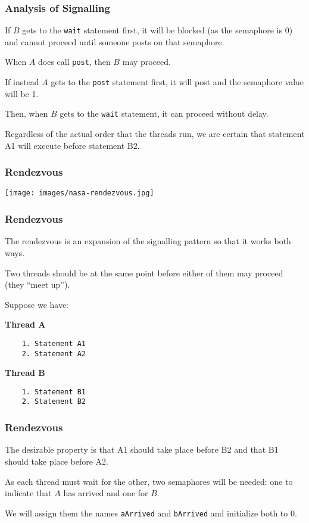 \begin{frame}
	\frametitle{Analysis of Signalling}

	If $B$ gets to the \texttt{wait} statement first, it will be blocked (as the semaphore is 0) and cannot proceed until someone posts on that semaphore.

	When $A$ does call \texttt{post}, then $B$ may proceed.

	If instead $A$ gets to the \texttt{post} statement first, it will post and the semaphore value will be 1.

	Then, when $B$ gets to the \texttt{wait} statement, it can proceed without delay.

	Regardless of the actual order that the threads run, we are certain that statement A1 will execute before statement B2.

\end{frame}


\begin{frame}
	\frametitle{Rendezvous}

	\begin{center}
		\texttt{[image: images/nasa-rendezvous.jpg]}
	\end{center}


\end{frame}


\begin{frame}[fragile]
	\frametitle{Rendezvous}

	The rendezvous is an expansion of the signalling pattern so that it works both ways.

	Two threads should be at the same point before either of them may proceed (they ``meet up'').

	Suppose we have:

	\begin{multicols}{2}
		\textbf{Thread A}
		\begin{verbatim}
	1. Statement A1
	2. Statement A2
  		\end{verbatim}
		\columnbreak
		\textbf{Thread B}\vspace{-2em}
		\begin{verbatim}
	1. Statement B1
	2. Statement B2
  		\end{verbatim}
	\end{multicols}
	\vspace{-2em}



\end{frame}

\begin{frame}
	\frametitle{Rendezvous}

	The desirable property is that A1 should take place before B2 and that B1 should take place before A2.

	As each thread must wait for the other, two semaphores will be needed: one to indicate that $A$ has arrived and one for $B$.

	We will assign them the names \texttt{aArrived} and \texttt{bArrived} and initialize both to 0.

\end{frame}

